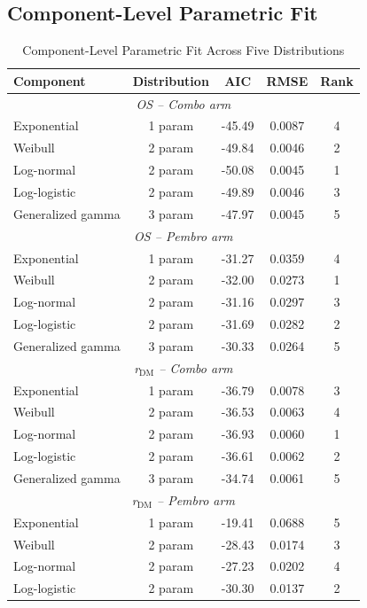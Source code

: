 \documentclass[11pt,a4paper]{article}
\begin{document}
\subsection{Component-Level Parametric Fit}
\label{sec:s3}
\begin{table}[H]
\centering
\caption{Component-Level Parametric Fit Across Five Distributions}
\label{tab:s3}
\begin{tabular}{lcccc}
\toprule
\textbf{Component} & \textbf{Distribution} & \textbf{AIC} & \textbf{RMSE} & \textbf{Rank} \\
\midrule
\multicolumn{5}{c}{\textit{OS -- Combo arm}} \\
Exponential & 1 param & -45.49 & 0.0087 & 4 \\
Weibull & 2 param & -49.84 & 0.0046 & 2 \\
Log-normal & 2 param & -50.08 & 0.0045 & 1 \\
Log-logistic & 2 param & -49.89 & 0.0046 & 3 \\
Generalized gamma & 3 param & -47.97 & 0.0045 & 5 \\
\midrule
\multicolumn{5}{c}{\textit{OS -- Pembro arm}} \\
Exponential & 1 param & -31.27 & 0.0359 & 4 \\
Weibull & 2 param & -32.00 & 0.0273 & 1 \\
Log-normal & 2 param & -31.16 & 0.0297 & 3 \\
Log-logistic & 2 param & -31.69 & 0.0282 & 2 \\
Generalized gamma & 3 param & -30.33 & 0.0264 & 5 \\
\midrule
\multicolumn{5}{c}{\textit{r$_{\text{DM}}$ -- Combo arm}} \\
Exponential & 1 param & -36.79 & 0.0078 & 3 \\
Weibull & 2 param & -36.53 & 0.0063 & 4 \\
Log-normal & 2 param & -36.93 & 0.0060 & 1 \\
Log-logistic & 2 param & -36.61 & 0.0062 & 2 \\
Generalized gamma & 3 param & -34.74 & 0.0061 & 5 \\
\midrule
\multicolumn{5}{c}{\textit{r$_{\text{DM}}$ -- Pembro arm}} \\
Exponential & 1 param & -19.41 & 0.0688 & 5 \\
Weibull & 2 param & -28.43 & 0.0174 & 3 \\
Log-normal & 2 param & -27.23 & 0.0202 & 4 \\
Log-logistic & 2 param & -30.30 & 0.0137 & 2 \\

\end{tabular}
\end{table}
\end{document}
